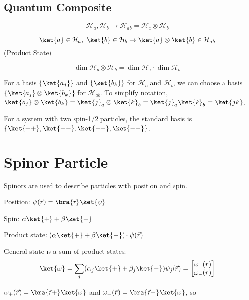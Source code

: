 \documentclass[a4paper,twoside,master.tex]{subfiles}
\begin{document}
\subsection{Quantum Composite}
\label{sub:quantum_composite}


\begin{equation}
\mathcal{H}_a,\mathcal{H}_b\to\mathcal{H}_{ab}=\mathcal{H}_a\otimes\mathcal{H}_b
\end{equation}

\begin{equation}
\ket{a}\in\mathcal{H}_a,\ \ket{b}\in\mathcal{H}_b\rightarrow\ket{a}\otimes\ket{b}\in\mathcal{H}_{ab}
\end{equation}
(Product State)

\begin{equation}
\dim{\mathcal{H}_a\otimes\mathcal{H}_b} = \dim{\mathcal{H}_a}\cdot\dim{\mathcal{H}_b}
\end{equation}

For a basis $\{\ket{a_j}\}$ and $\{\ket{b_k}\}$ for
$\mathcal{H}_a$ and $\mathcal{H}_b$, we can choose a basis
$\{\ket{a_j}\otimes\ket{b_k}\}$ for $\mathcal{H}_{ab}$. To
simplify notation,
$\ket{a_j}\otimes\ket{b_k} = \ket{j}_a\otimes\ket{k}_b = \ket{j}_a\ket{k}_b = \ket{jk}$.

For a system with two spin-1/2 particles, the standard basis is
$\{\ket{++},\ket{+-},\ket{-+},\ket{--}\}$.

\section{Spinor Particle}
\label{sec:spinor_particle}


Spinors are used to describe particles with position and spin.

Position: $\psi(\vec{r}) = \bra{\vec{r}}\ket{\psi}$

Spin: $\alpha\ket{+} + \beta\ket{-}$

Product state: $(\alpha\ket{+}+\beta\ket{-})\cdot\psi(\vec{r})$

General state is a sum of product states:
\begin{equation}
\ket{\omega}=\sum_j(\alpha_j\ket{+}+\beta_j\ket{-})\psi_j(\vec{r}) = \begin{bmatrix}\omega_+(r)\\\omega_-(r)\end{bmatrix}
\end{equation}

$\omega_+(\vec{r})=\bra{\vec{r}+}\ket{\omega}$ and $\omega_-(\vec{r}) = \bra{\vec{r}-}\ket{\omega}$, so
\end{document}
